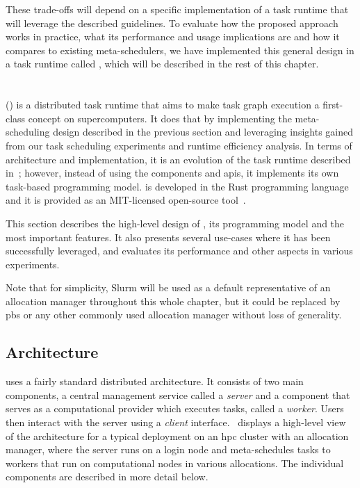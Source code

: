 These trade-offs will depend on a specific implementation of a task runtime that will leverage the
described guidelines. To evaluate how the proposed approach works in practice, what its performance
and usage implications are and how it compares to existing meta-schedulers, we have implemented
this general design in a task runtime called \hyperqueue{}, which will be described in
the rest of this chapter.

\section{\hyperqueue{}}
\hyperqueue{} (\hq{}) is a distributed task runtime that aims to make task graph execution a
first-class concept on supercomputers. It does that by implementing the meta-scheduling design
described in the previous section and leveraging insights gained from our task scheduling
experiments and \dask{} runtime efficiency analysis. In terms of architecture and
implementation, it is an evolution of the \rsds{} task runtime described
in~; however, instead of using the \dask{} components and
\glspl{api}, it implements its own task-based programming model.
\hyperqueue{} is developed in the Rust programming language~\cite{rust} and
it is provided as an \mbox{MIT-licensed} open-source tool~\cite{hq_github}.

This section describes the high-level design of \hyperqueue{}, its programming model and
the most important features. It also presents several use-cases where it has been successfully
leveraged, and evaluates its performance and other aspects in various experiments.

Note that for simplicity, Slurm will be used as a default representative of an allocation manager
throughout this whole chapter, but it could be replaced by \gls{pbs} or any other
commonly used allocation manager without loss of generality.

\subsection{Architecture}
\label{hq:architecture}
\hyperqueue{} uses a fairly standard distributed architecture. It consists of two main
components, a central management service called a \emph{server} and a component that
serves as a computational provider which executes tasks, called a \emph{worker}. Users
then interact with the server using a \emph{client} interface.~
displays a high-level view of the \hq{} architecture for a typical deployment on
an \gls{hpc} cluster with an allocation manager, where the server runs on a login
node and meta-schedules tasks to workers that run on computational nodes in various allocations.
The individual components are described in more detail below.

